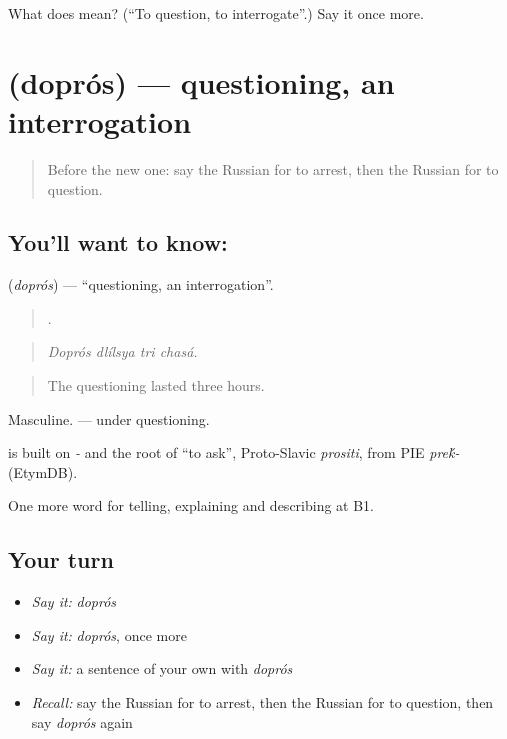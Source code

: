 \begin{tcolorbox}[breakable,colback=teal!4,colframe=teal!35!black,title={Before you move on}]
What does  mean? (\textquotedblleft{}To question, to interrogate\textquotedblright{}.) Say it once more.
\end{tcolorbox}
\section[\texorpdfstring{\ru{допрос} (doprós)}{допрос (doprós)}]{ (doprós) — questioning, an interrogation}

\label{lesson:RU-C292-dopros}



\begin{quote}
Before the new one: say the Russian for to arrest, then the Russian for to question.
\end{quote}

\subsection*{You'll want to know: }
\textbf{} (\emph{doprós}) — \textquotedblleft{}questioning, an interrogation\textquotedblright{}.

\begin{quote}
   .
\end{quote}

\begin{quote}
\emph{Doprós dlílsya tri chasá.}
\end{quote}

\begin{quote}
The questioning lasted three hours.
\end{quote}

Masculine. \emph{ } — under questioning.

\begin{cousinweb}
\emph{} is built on \emph{-} and the root of \emph{} \textquotedblleft{}to ask\textquotedblright{}, Proto-Slavic \emph{prositi}, from PIE \emph{pre\'{k}-} (EtymDB).
\end{cousinweb}

\begin{grammarlens}[title={What you've built}]
One more word for telling, explaining and describing at B1.
\end{grammarlens}

\subsection*{Your turn}
\begin{itemize}
\raggedright
  \item \emph{Say it:} \emph{doprós}
  \item \emph{Say it:} \emph{doprós}, once more
  \item \emph{Say it:} a sentence of your own with \emph{doprós}
  \item \emph{Recall:} say the Russian for to arrest, then the Russian for to question, then say \emph{doprós} again
\end{itemize}

